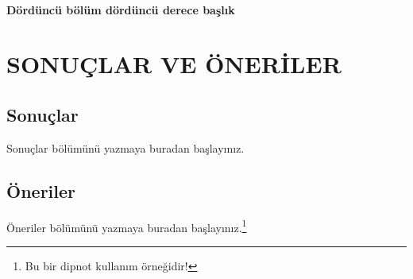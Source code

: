 \documentclass[12pt,oneside]{report}
\begin{document}
	\subsubsection{Dördüncü bölüm dördüncü derece başlık}

	\chapter{SONUÇLAR VE ÖNERİLER}
	
	\section{Sonuçlar}
	Sonuçlar bölümünü yazmaya buradan başlayınız.
	
	\section{Öneriler}
	Öneriler bölümünü yazmaya buradan başlayınız.\footnote{Bu bir dipnot kullanım örneğidir!}
	
	
	
	
	
	\clearpage

	
	
\end{document}
